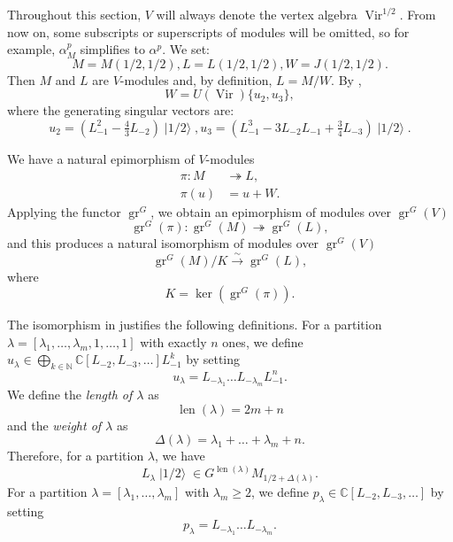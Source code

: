 \documentclass[a4paper, 12pt, reqno]{amsart}
\theoremstyle{remark}
\DeclareMathOperator{\Vir}{Vir}
\DeclareMathOperator{\gr}{gr}
\DeclareMathOperator{\len}{len}
\DeclareMathOperator{\vachalf}{|1/2\rangle}
\begin{document}
Throughout this section, $V$ will always denote the vertex algebra $\Vir^{1/2}$.
From now on, some subscripts or superscripts of modules will be omitted, so for example, $\alpha^p_M$ simplifies to $\alpha^p$.
We set:
\begin{equation*}
  M = M(1/2, 1/2), L = L(1/2, 1/2), W = J(1/2, 1/2).
\end{equation*}
Then $M$ and $L$ are $V$-modules and, by definition, $L = M/W$.
By ,
\begin{equation}
  \label{eq:47}
  W = U(\Vir)\{u_2, u_3\},
\end{equation}
where the generating singular vectors are:
\begin{equation}
  \label{eq:48}
  u_2 = (L_{-1}^2 - \tfrac{4}{3}L_{-2})\vachalf, u_3 = (L_{-1}^3 - 3L_{-2}L_{-1} + \tfrac{3}{4}L_{-3})\vachalf.
\end{equation}

We have a natural epimorphism of $V$-modules
\begin{align*}
  \pi: M &\twoheadrightarrow L, \\
  \pi(u) &= u + W.
\end{align*}
Applying the functor $\gr^G$, we obtain an epimorphism of modules over $\gr^G(V)$
\begin{equation*}
  \gr^G(\pi): \gr^G(M) \twoheadrightarrow \gr^G(L),
\end{equation*}
and this produces a natural isomorphism of modules over $\gr^G(V)$
\begin{equation*}
  \gr^G(M)/K \xrightarrow{\sim} \gr^G(L),
\end{equation*}
where
\begin{equation}
  \label{eq:49}
  K = \ker(\gr^G(\pi)).
\end{equation}

The isomorphism in  justifies the following definitions.
For a partition $\lambda = [\lambda_1, \dots, \lambda_m, 1, \dots, 1]$ with exactly $n$ ones, we define $u_{\lambda} \in \bigoplus_{k \in \mathbb{N}}\mathbb{C}[L_{-2}, L_{-3}, \dots]L_{-1}^k$ by setting
\begin{equation*}
  u_{\lambda} = L_{-\lambda_1}\dots L_{-\lambda_m}L_{-1}^n.
\end{equation*}
We define the \emph{length of $\lambda$} as
\begin{equation*}
  \len(\lambda) = 2m + n
\end{equation*}
and the \emph{weight of $\lambda$} as
\begin{equation*}
  \Delta(\lambda) = \lambda_1 + \dots + \lambda_m + n.
\end{equation*}
Therefore, for a partition $\lambda$, we have
\begin{equation*}
  L_{\lambda}\vachalf \in G^{\len(\lambda)}M_{1/2 + \Delta(\lambda)}.
\end{equation*}
For a partition $\lambda = [\lambda_1, \dots, \lambda_m]$ with $\lambda_m \ge 2$, we define $p_{\lambda} \in \mathbb{C}[L_{-2}, L_{-3}, \dots]$ by setting
\begin{equation*}
  p_{\lambda} = L_{-\lambda_1}\dots L_{-\lambda_m}.
\end{equation*}
\end{document}
